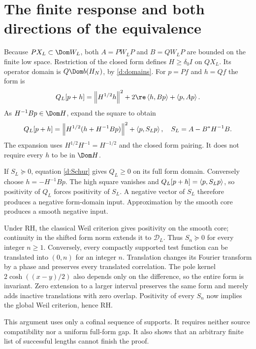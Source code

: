 \section{The finite response and both directions of the equivalence}
Because $PX_L\subset\Dom W_L$, both $A=PW_LP$ and $B=QW_LP$ are bounded
on the finite low space. Restriction of the closed form defines
$H\ge\delta_0I$ on $QX_L$. Its operator domain is
$Q\Dom b(H_N)$, by \eqref{d:domains}. For $p=Pf$ and $h=Qf$ the form is
\[
Q_L[p+h]=\norm{H^{1/2}h}^2+2\re\ip h{Bp}+\ip p{Ap}.
\]
As $H^{-1}Bp\in\Dom H$, expand the square to obtain
\begin{equation}\label{d:Schur}
Q_L[p+h]=\left\lVert H^{1/2}(h+H^{-1}Bp)\right\rVert^2+\left\langle p,S_Lp\right\rangle,
\quad S_L=A-B^*H^{-1}B.
\end{equation}
The expansion uses $H^{1/2}H^{-1}=H^{-1/2}$ and the closed form pairing.
It does not require every $h$ to be in $\Dom H$.

If $S_L\succeq0$, equation \eqref{d:Schur} gives $Q_L\ge0$ on its full
form domain. Conversely choose $h=-H^{-1}Bp$. The high square vanishes
and $Q_L[p+h]=\left\langle p,S_Lp\right\rangle$, so positivity of $Q_L$ forces positivity of
$S_L$. A negative vector of $S_L$ therefore produces a negative form-domain
input. Approximation by the smooth core produces a smooth negative input.

Under RH, the classical Weil criterion gives positivity on the smooth
core; continuity in the shifted form norm extends it to $\mathcal D_L$.
Thus $S_n\succeq0$ for every integer $n\ge1$.
Conversely, every compactly supported test function can be translated into
$(0,n)$ for an integer $n$. Translation changes its Fourier transform by
a phase and preserves every translated correlation. The pole kernel
$2\cosh((x-y)/2)$ also depends only on the difference, so the entire form
is invariant. Zero extension to a larger interval preserves the same
form and merely adds inactive translations with zero overlap. Positivity
of every $S_n$ now implies the global Weil criterion, hence RH.

This argument uses only a cofinal sequence of supports. It requires
neither source compatibility nor a uniform full-form gap. It also shows
that an arbitrary finite list of successful lengths cannot finish the proof.

